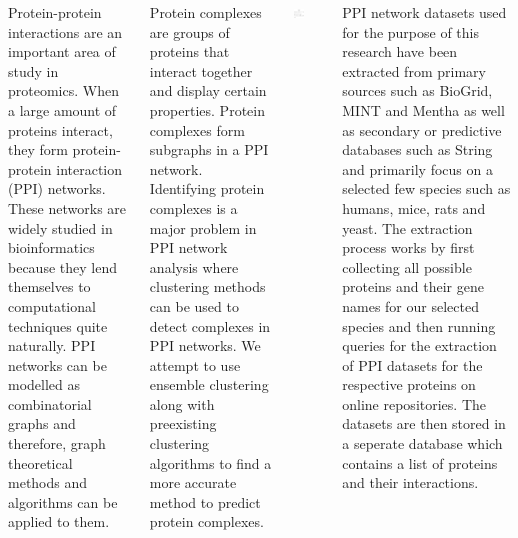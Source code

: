 \documentclass[25pt, a0paper, portrait]{tikzposter}
\begin{document}
\begin{columns}
    {
        Protein-protein interactions are an important area of study in proteomics. When a large amount of proteins interact, they form protein-protein interaction (PPI) networks. These networks are widely studied in bioinformatics because they lend themselves to computational techniques quite naturally. 
        PPI networks can be modelled as combinatorial graphs and therefore, graph theoretical methods and algorithms can be applied to them. 
        
        Protein complexes are groups of proteins that interact together and display certain properties. Protein complexes form subgraphs in a PPI network. Identifying protein complexes 
        is a major problem in PPI network analysis where clustering methods can be used to detect complexes in PPI networks. We attempt to use ensemble clustering along with preexisting clustering algorithms to find a more accurate method to predict protein complexes. 
    }
    {
        \begin{tikzfigure}
            \includegraphics[width=0.35\textwidth]{images/systemdiag.png}
        \end{tikzfigure}
    }
    {
        PPI network datasets used for the purpose of this research have been extracted from primary sources such as BioGrid, MINT and Mentha as well as secondary or predictive databases such as String and primarily focus on a selected few species such as humans, mice, rats and yeast. The extraction process works by first collecting all possible proteins and their gene names for our selected species and then running queries for the extraction of PPI datasets for the respective proteins on online repositories. The datasets are then stored in a seperate database which contains a list of proteins and their interactions.
    }
 

\end{columns}
\end{document}

